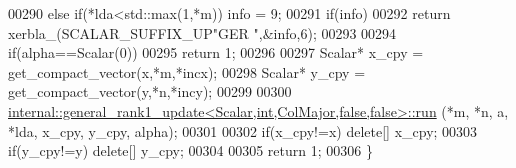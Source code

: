 \begin{DoxyCode}
00290   \textcolor{keywordflow}{else} \textcolor{keywordflow}{if}(*lda<std::max(1,*m))                                        info = 9;
00291   \textcolor{keywordflow}{if}(info)
00292     \textcolor{keywordflow}{return} xerbla\_(SCALAR\_SUFFIX\_UP\textcolor{stringliteral}{"GER  "},&info,6);
00293 
00294   \textcolor{keywordflow}{if}(alpha==Scalar(0))
00295     \textcolor{keywordflow}{return} 1;
00296 
00297   Scalar* x\_cpy = get\_compact\_vector(x,*m,*incx);
00298   Scalar* y\_cpy = get\_compact\_vector(y,*n,*incy);
00299 
00300   \hyperlink{structinternal_1_1general__rank1__update}{internal::general\_rank1\_update<Scalar,int,ColMajor,false,false>::run}
      (*m, *n, a, *lda, x\_cpy, y\_cpy, alpha);
00301 
00302   \textcolor{keywordflow}{if}(x\_cpy!=x)  \textcolor{keyword}{delete}[] x\_cpy;
00303   \textcolor{keywordflow}{if}(y\_cpy!=y)  \textcolor{keyword}{delete}[] y\_cpy;
00304 
00305   \textcolor{keywordflow}{return} 1;
00306 \}
\end{DoxyCode}
